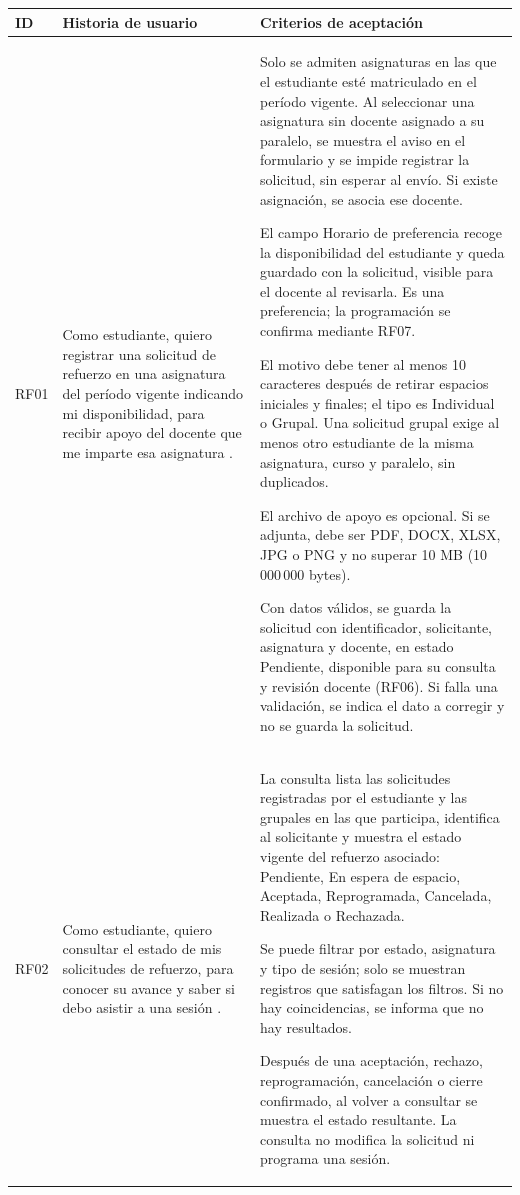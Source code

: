 \begin{longtable}{@{}p{}p{}p{}@{}}
\toprule\textbf{ID}&\textbf{Historia de usuario}&\textbf{Criterios de aceptación}\\\midrule\endhead
RF01 &
Como estudiante, quiero registrar una solicitud de refuerzo
en una asignatura del período vigente indicando mi disponibilidad,
para recibir apoyo
del docente que me imparte esa asignatura
\cite{Ponce2025-Entrevista,SGRA-documentacion-original}. &
Solo se admiten asignaturas en las que el estudiante esté
matriculado en el período vigente. Al seleccionar una
asignatura sin docente asignado a su paralelo, se muestra
el aviso en el formulario y se impide registrar la solicitud,
sin esperar al envío. Si existe asignación, se asocia ese docente.
\par\smallskip\noindent
El campo Horario de preferencia recoge la disponibilidad
del estudiante y queda guardado con la solicitud, visible
para el docente al revisarla. Es una preferencia;
la programación se confirma mediante RF07.
\par\smallskip\noindent
El motivo debe tener al menos 10 caracteres después de
retirar espacios iniciales y finales; el tipo es Individual
o Grupal. Una solicitud grupal exige al menos otro estudiante
de la misma asignatura, curso y paralelo, sin duplicados.
\par\smallskip\noindent
El archivo de apoyo es opcional. Si se adjunta, debe ser
PDF, DOCX, XLSX, JPG o PNG y no superar 10 MB
(10\,000\,000 bytes).
\par\smallskip\noindent
Con datos válidos, se guarda la solicitud con identificador,
solicitante, asignatura y docente, en estado Pendiente,
disponible para su consulta y revisión docente (RF06).
Si falla una validación, se indica el dato a corregir
y no se guarda la solicitud. \\

RF02 &
Como estudiante, quiero consultar el estado de mis
solicitudes de refuerzo, para conocer su avance
y saber si debo asistir a una sesión
\cite{Ponce2025-Entrevista,SGRA-documentacion-original}. &
La consulta lista las solicitudes registradas por el estudiante
y las grupales en las que participa, identifica al solicitante
y muestra el estado vigente del refuerzo asociado:
Pendiente, En espera de espacio, Aceptada, Reprogramada,
Cancelada, Realizada o Rechazada.
\par\smallskip\noindent
Se puede filtrar por estado, asignatura y tipo de sesión;
solo se muestran registros que satisfagan los filtros.
Si no hay coincidencias, se informa que no hay resultados.
\par\smallskip\noindent
Después de una aceptación, rechazo, reprogramación,
cancelación o cierre confirmado, al volver a consultar
se muestra el estado resultante. La consulta no modifica
la solicitud ni programa una sesión. \\


\end{longtable}
